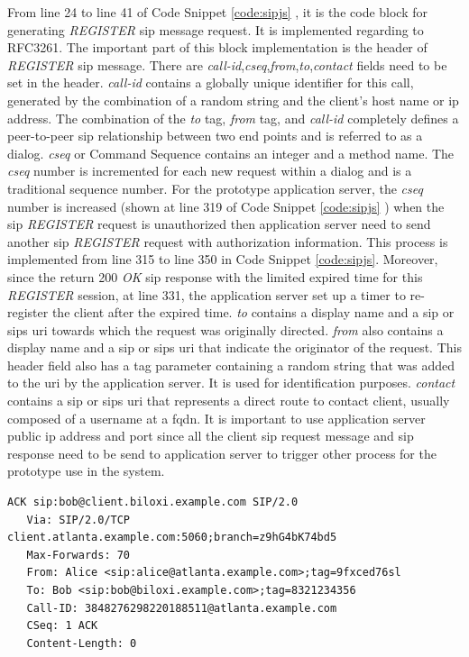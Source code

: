 \par From line 24 to line 41 of Code Snippet \ref{code:sipjs} , it is the code block for generating \textit{REGISTER} \gls{sip} message request. It is implemented regarding to RFC3261. The important part of this block implementation is the header of \textit{REGISTER} \gls{sip} message. There are \textit{call-id},\textit{cseq},\textit{from},\textit{to},\textit{contact} fields need to be set in the header. \textit{call-id} contains a globally unique identifier for this call, generated by the combination of a random string and the client's host name or \gls{ip} address. The combination of the \textit{to} tag, \textit{from} tag, and \textit{call-id} completely defines a peer-to-peer \gls{sip} relationship between two end points and is referred to as a dialog. \textit{cseq} or Command Sequence contains an integer and a method name. The \textit{cseq} number is incremented for each new request within a dialog and is a traditional sequence number. For the prototype application server, the \textit{cseq} number is increased (shown at line 319 of Code Snippet \ref{code:sipjs} ) when the \gls{sip} \textit{REGISTER} request is unauthorized then application server need to send another \gls{sip} \textit{REGISTER} request with authorization information. This process is implemented from line 315 to line 350 in Code Snippet \ref{code:sipjs}. Moreover, since the return 200 \textit{OK} \gls{sip} response with the limited expired time for this \textit{REGISTER} session, at line 331, the application server set up a timer to re-register the client after the expired time. \textit{to} contains a display name and a \gls{sip} or \gls{sip}s \gls{uri} towards which the request was originally directed. \textit{from} also contains a display name and a \gls{sip} or \gls{sip}s \gls{uri} that indicate the originator of the request. This header field also has a tag parameter containing a random string that was added to the \gls{uri} by the application server. It is used for identification purposes. \textit{contact} contains a \gls{sip} or \gls{sip}s \gls{uri} that represents a direct route to contact client, usually composed of a username at a \gls{fqdn}. It is important to use application server public \gls{ip} address and port since all the client \gls{sip} request message and \gls{sip} response need to be send to application server to trigger other process for the prototype use in the system.

\begin{lstlisting}[caption={ACK Alice -> Bob Sample \cite{rfc:3665}},label={code:ack_sample}]
   ACK sip:bob@client.biloxi.example.com SIP/2.0
   Via: SIP/2.0/TCP client.atlanta.example.com:5060;branch=z9hG4bK74bd5
   Max-Forwards: 70
   From: Alice <sip:alice@atlanta.example.com>;tag=9fxced76sl
   To: Bob <sip:bob@biloxi.example.com>;tag=8321234356
   Call-ID: 3848276298220188511@atlanta.example.com
   CSeq: 1 ACK
   Content-Length: 0
\end{lstlisting}

